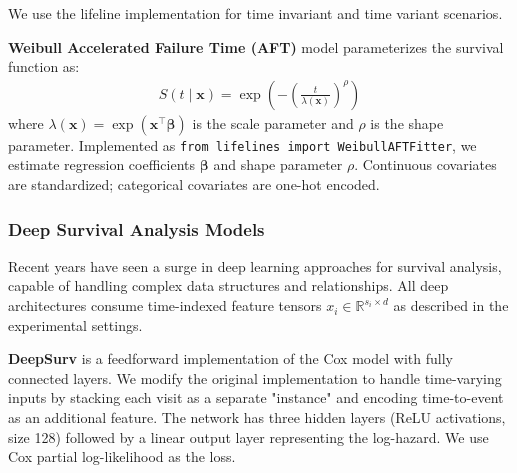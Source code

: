 We use the lifeline implementation for time invariant and time variant scenarios.

\textbf{Weibull Accelerated Failure Time (AFT)} model \citep{anderson1991nonproportional_weibull} parameterizes the survival function as:
\begin{align}
S(t \mid \mathbf{x}) = \exp\left(-\left(\frac{t}{\lambda(\mathbf{x})}\right)^{\rho}\right)
\end{align}
where $\lambda(\mathbf{x}) = \exp(\mathbf{x}^\intercal \boldsymbol{\beta})$ is the scale parameter and $\rho$ is the shape parameter. Implemented as \texttt{from lifelines import WeibullAFTFitter}, we estimate regression coefficients $\boldsymbol{\beta}$ and shape parameter $\rho$. Continuous covariates are standardized; categorical covariates are one-hot encoded.


\subsubsection{Deep Survival Analysis Models}

Recent years have seen a surge in deep learning approaches for survival analysis, capable of handling complex data structures and relationships. All deep architectures consume time-indexed feature tensors $x_i \in \mathbb{R}^{s_i\times d}$ as described in the experimental settings.

\textbf{DeepSurv} \citep{katzman2018deepsurv} is a feedforward implementation of the Cox model with fully connected layers. We modify the original implementation to handle time-varying inputs by stacking each visit as a separate "instance" and encoding time-to-event as an additional feature. The network has three hidden layers (ReLU activations, size 128) followed by a linear output layer representing the log-hazard. We use Cox partial log-likelihood as the loss.

